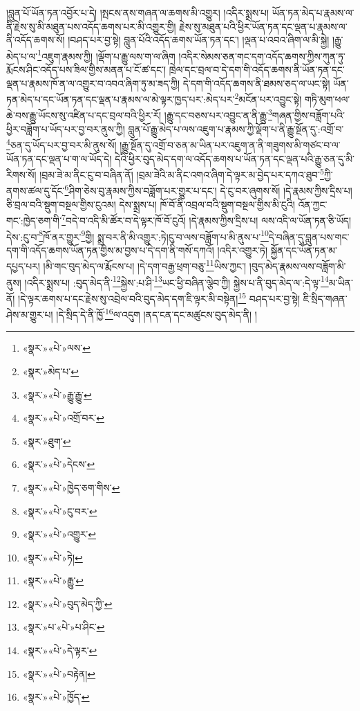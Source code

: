 །བླུན་པོ་ཡོན་ཏན་འབྱོར་པ་དེ། །སྤངས་ནས་གཞན་ལ་ཆགས་མི་འགྱུར། །འདིར་སྨྲས་པ། ཡོན་ཏན་མེད་པ་རྣམས་ལ་ནི་རྗེས་སུ་མི་མཐུན་པས་འདོད་ཆགས་པར་མི་འགྱུར་གྱི། རྗེས་སུ་མཐུན་པའི་ཕྱིར་ཡོན་ཏན་དང་ལྡན་པ་རྣམས་ལ་ནི་འདོད་ཆགས་སོ། །བཤད་པར་བྱ་སྟེ། བླུན་པོའི་འདོད་ཆགས་ཡོན་ཏན་དང་། །ལྡན་པ་འབའ་ཞིག་ལ་མི་སྐྱེ། །རྒྱུ་མེད་པ་ལ་\footnote{«སྣར་»«པེ་»ལས་}འཇུག་རྣམས་ཀྱི། །ལྡོག་པ་རྒྱུ་ལས་ག་ལ་ཞིག །འདིར་སེམས་ཅན་གང་དག་འདོད་ཆགས་ཀྱིས་ཀུན་ཏུ་རྨོངས་ཤིང་འདོད་པས་ཟིལ་གྱིས་མནན་པ་ངོ་ཚ་དང་། ཁྲེལ་དང་བྲལ་བ་དེ་དག་གི་འདོད་ཆགས་ནི་ཡོན་ཏན་དང་ལྡན་པ་རྣམས་ཁོ་ན་ལ་འགྱུར་བ་འབའ་ཞིག་ཏུ་མ་ཟད་ཀྱི། དེ་དག་གི་འདོད་ཆགས་ནི་ཐམས་ཅད་ལ་ཡང་སྟེ། ཡོན་ཏན་མེད་པ་དང་ཡོན་ཏན་དང་ལྡན་པ་རྣམས་ལ་མེ་ལྟར་ཁྱད་པར་:མེད་པར་\footnote{«སྣར་»མེད་པ་}མངོན་པར་འབྱུང་སྟེ། གཏི་མུག་ཕལ་ཆེ་བས་རྒྱུ་ཡོངས་སུ་འཛིན་པ་དང་བྲལ་བའི་ཕྱིར་རོ། །རྒྱུ་དང་བཅས་པར་འབྱུང་ན་ནི་རྒྱུ་\footnote{«སྣར་»«པེ་»རྒྱུ་རྒྱུ་}གཞན་གྱིས་བཟློག་པའི་ཕྱིར་བཟློག་པ་ཡོད་པར་བྱ་བར་ནུས་ཀྱི། བླུན་པོ་རྒྱུ་མེད་པ་ལས་འཇུག་པ་རྣམས་ཀྱི་ལྡོག་པ་ནི་རྒྱུ་སྔོན་དུ་:འགྲོ་བ་\footnote{«སྣར་»«པེ་»འགྲོ་བར་}ཅན་དུ་ཡོད་པར་བྱ་བར་མི་ནུས་སོ། །རྒྱུ་སྔོན་དུ་འགྲོ་བ་ཅན་མ་ཡིན་པར་འཇུག་ན་ནི་གཟུགས་མི་གཙང་བ་ལ་ཡོན་ཏན་དང་ལྡན་པ་ག་ལ་ཡོད་དེ། དེའི་ཕྱིར་བུད་མེད་དག་ལ་འདོད་ཆགས་པ་ཡོན་ཏན་དང་ལྡན་པའི་རྒྱུ་ཅན་དུ་མི་རིགས་སོ། །བྲམ་ཟེ་མ་ནིང་ངུ་བ་བཞིན་ནོ། །བྲམ་ཟེའི་མ་ནིང་འགའ་ཞིག་དེ་ལྟར་མ་བྱེད་པར་དཀའ་ཐུབ་\footnote{«སྣར་»ཐུག་}ཀྱི་ནགས་ཚལ་དུ་དོང་\footnote{«སྣར་»«པེ་»དེངས་}ཤིག་ཅེས་བུ་རྣམས་ཀྱིས་བཟློག་པར་གྱུར་པ་དང་། དེ་ངུ་བར་ཞུགས་སོ། །དེ་རྣམས་ཀྱིས་དྲིས་པ། ཅི་བྲལ་བའི་སྡུག་བསྔལ་གྱིས་ངུའམ། དེས་སྨྲས་པ། ཁོ་བོ་ནི་འབྲལ་བའི་སྡུག་བསྔལ་གྱིས་མི་ངུའི། འོན་ཀྱང་གང་:ཁྱེད་ཅག་གི་\footnote{«སྣར་»«པེ་»ཁྱེད་ཅག་གིས་}བདེ་བ་འདི་མི་ཚོར་བ་དེ་ལྟར་ཁོ་བོ་ངུའོ། །དེ་རྣམས་ཀྱིས་དྲིས་པ། ལས་འདི་ལ་ཡོན་ཏན་ཅི་ཡོད། དེས་:ངུ་བ་\footnote{«སྣར་»«པེ་»ངུ་བར་}ཁོ་ནར་གྱུར་\footnote{«སྣར་»«པེ་»འགྱུར་}གྱི། སྨྲ་བར་ནི་མི་འགྱུར་:ཏེ།ངུ་བ་ལས་བཟློག་པ་མི་ནུས་པ་\footnote{«སྣར་»«པེ་»ཏེ།}དེ་བཞིན་དུ་བླུན་པས་གང་དག་གི་འདོད་ཆགས་ཡོན་ཏན་གྱིས་མ་བྱས་པ་དེ་དག་ནི་གསོ་དཀའོ། །འདིར་འགྱུར་ཏེ། སྐྱོན་དང་ཡོན་ཏན་མ་དཔྱད་པར། །མི་གང་བུད་མེད་ལ་རྨོངས་པ། །དེ་དག་བརྒྱ་ཕྲག་བཅུ་\footnote{«སྣར་»«པེ་»རྒྱུ་}ཡིས་ཀྱང་། །བུད་མེད་རྣམས་ལས་བཟློག་མི་ནུས། །འདིར་སྨྲས་པ། :བུད་མེད་ནི་\footnote{«སྣར་»«པེ་»བུད་མེད་ཀྱི་}སྐྱེས་:པ་ཤི་\footnote{«སྣར་»པ་«པེ་»པ་ཤིང་}ཡང་ཕྱི་བཞིན་ལྕེབ་ཀྱི། སྐྱེས་པ་ནི་བུད་མེད་ལ་:དེ་ལྟ་\footnote{«སྣར་»«པེ་»དེ་ལྟར་}མ་ཡིན་ནོ། །དེ་ལྟར་ཆགས་པ་དང་རྗེས་སུ་འབྲེལ་བའི་བུད་མེད་དག་ཇི་ལྟར་མི་བསྟེན།\footnote{«སྣར་»«པེ་»བརྟེན།} བཤད་པར་བྱ་སྟེ། ཇི་སྲིད་གཞན་ཤེས་མ་གྱུར་པ། །དེ་སྲིད་དེ་ནི་ཁྱོ་\footnote{«སྣར་»«པེ་»ཁྱོད་}ལ་འདུག །ནད་ངན་དང་མཚུངས་བུད་མེད་ནི། །

